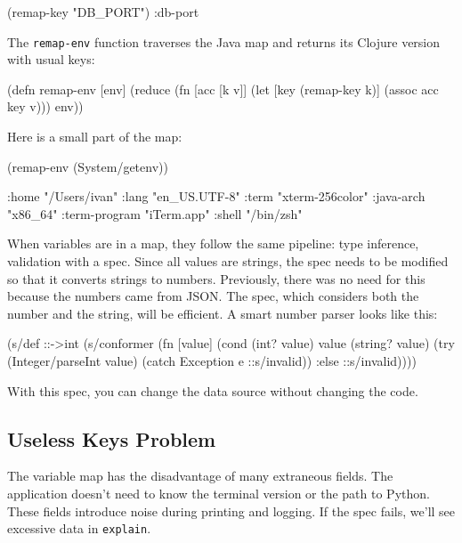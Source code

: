 \begin{clojure}
(remap-key "DB_PORT")
:db-port
\end{clojure}


The \verb|remap-env| function traverses the Java map and returns its Clojure version with usual keys:

\begin{clojure}
(defn remap-env [env]
  (reduce
   (fn [acc [k v]]
     (let [key (remap-key k)]
       (assoc acc key v)))
   {}
   env))
\end{clojure}

Here is a small part of the map:

\begin{clojure}
(remap-env (System/getenv))

{:home "/Users/ivan"
 :lang "en_US.UTF-8"
 :term "xterm-256color"
 :java-arch "x86_64"
 :term-program "iTerm.app"
 :shell "/bin/zsh"}
\end{clojure}

When variables are in a map, they follow the same pipeline: type inference, validation with a spec. Since all values are strings, the spec needs to be modified so that it converts strings to numbers. Previously, there was no need for this because the numbers came from JSON. The spec, which considers both the number and the string, will be efficient. A smart number parser looks like this:

\begin{clojure}
(s/def ::->int
  (s/conformer
   (fn [value]
     (cond
       (int? value) value
       (string? value)
       (try (Integer/parseInt value)
            (catch Exception e
              ::s/invalid))
       :else ::s/invalid))))
\end{clojure}

\noindent
With this spec, you can change the data source without changing the code.

\subsection{Useless Keys Problem}

The variable map has the disadvantage of many extraneous fields. The application doesn't need to know the terminal version or the path to Python. These fields introduce noise during printing and logging. If the spec fails, we'll see excessive data in \verb|explain|.

